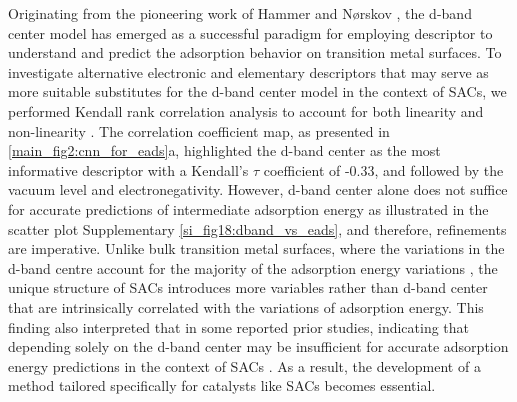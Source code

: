 Originating from the pioneering work of Hammer and Nørskov \cite{hammer2000theoretical},
the d-band center model has emerged as a successful paradigm for employing descriptor to understand and predict the adsorption behavior on transition metal surfaces.
To investigate alternative electronic and elementary descriptors that may serve as more suitable substitutes for the d-band center model in the context of SACs,
we performed Kendall rank correlation analysis to account for both linearity and non-linearity \cite{kendall1938new}.
The correlation coefficient map, as presented in \cref{main_fig2:cnn_for_eads}a, highlighted the d-band center as the most informative descriptor with a Kendall's $\tau$ coefficient of -0.33, and followed by the vacuum level and electronegativity.
However, d-band center alone does not suffice for accurate predictions of intermediate adsorption energy as illustrated in the scatter plot Supplementary \cref{si_fig18:dband_vs_eads}, and therefore, refinements are imperative.
Unlike bulk transition metal surfaces, where the variations in the d-band centre account for the majority of the adsorption energy variations \cite{norskov2011density, takigawa2016machine}, the unique structure of SACs introduces more variables rather than d-band center that are intrinsically correlated with the variations of adsorption energy.
This finding also interpreted that in some reported prior studies, indicating that depending solely on the d-band center may be insufficient for accurate adsorption energy predictions in the context of SACs \cite{sun2022going, fung2020descriptors, di2022universal, yuan2020descriptor, huang2020rational}.
As a result, the development of a method tailored specifically for catalysts like SACs becomes essential.

